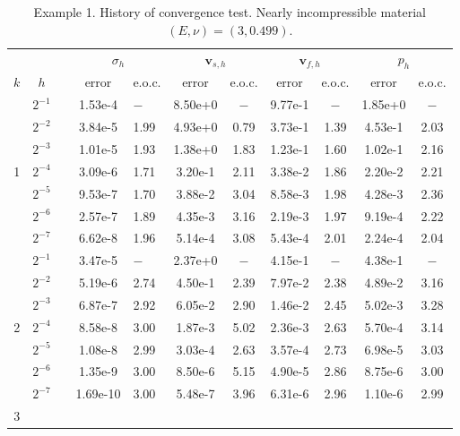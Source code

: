 \documentclass[10pt,letterpaper]{amsart}
\theoremstyle{plain} %
\theoremstyle{remark} %
\newcommand{\vect}[1]{\mathbf{#1}}
\begin{document}
\begin{table}[htbp!]
\small
\centering
\caption{Example 1. History of convergence test. Nearly incompressible material $(E,\nu) = (3,0.499)$.}
\begin{tabular}{@{\hskip .1in}ccl@{\hskip .1in}cl@{\hskip .1in}cc@{\hskip .1in}cc@{\hskip .1in}cc} \toprule
& & &\multicolumn{2}{c}{$\sigma_{h}$}&\multicolumn{2}{c}{$\vect{v}_{s,h}$}&\multicolumn{2}{c}{$\vect{v}_{f,h}$}&\multicolumn{2}{c}{$p_{h}$}\\ 
\cmidrule(lr){4-5} \cmidrule(lr){6-7} \cmidrule(lr){8-9} \cmidrule(lr){10-11}%
$k$ & $h$ & & error & e.o.c. & error & e.o.c. & error & e.o.c.& error & e.o.c.\\ \midrule
\multirow{7}{*}{1} 
 & $2^{-1}$    & & 1.53e-4 & $-$  & 8.50e+0 & $-$  & 9.77e-1 & $-$  & 1.85e+0 & $-$  \\
 & $2^{-2}$    & & 3.84e-5 & 1.99 & 4.93e+0 & 0.79 & 3.73e-1 & 1.39 & 4.53e-1 & 2.03 \\
 & $2^{-3}$    & & 1.01e-5 & 1.93 & 1.38e+0 & 1.83 & 1.23e-1 & 1.60 & 1.02e-1 & 2.16 \\
 & $2^{-4}$    & & 3.09e-6 & 1.71 & 3.20e-1 & 2.11 & 3.38e-2 & 1.86 & 2.20e-2 & 2.21 \\
 & $2^{-5}$    & & 9.53e-7 & 1.70 & 3.88e-2 & 3.04 & 8.58e-3 & 1.98 & 4.28e-3 & 2.36 \\
 & $2^{-6}$    & & 2.57e-7 & 1.89 & 4.35e-3 & 3.16 & 2.19e-3 & 1.97 & 9.19e-4 & 2.22 \\
 & $2^{-7}$    & & 6.62e-8 & 1.96 & 5.14e-4 & 3.08 & 5.43e-4 & 2.01 & 2.24e-4 & 2.04 \\
\midrule
\multirow{7}{*}{2} 
 & $2^{-1}$   & & 3.47e-5 & $-$  & 2.37e+0 & $-$  & 4.15e-1 & $-$  & 4.38e-1 & $-$  \\
 & $2^{-2}$   & & 5.19e-6 & 2.74 & 4.50e-1 & 2.39 & 7.97e-2 & 2.38 & 4.89e-2 & 3.16 \\
 & $2^{-3}$   & & 6.87e-7 & 2.92 & 6.05e-2 & 2.90 & 1.46e-2 & 2.45 & 5.02e-3 & 3.28 \\
 & $2^{-4}$   & & 8.58e-8 & 3.00 & 1.87e-3 & 5.02 & 2.36e-3 & 2.63 & 5.70e-4 & 3.14 \\
 & $2^{-5}$   & & 1.08e-8 & 2.99 & 3.03e-4 & 2.63 & 3.57e-4 & 2.73 & 6.98e-5 & 3.03 \\
 & $2^{-6}$   & & 1.35e-9 & 3.00 & 8.50e-6 & 5.15 & 4.90e-5 & 2.86 & 8.75e-6 & 3.00 \\
 & $2^{-7}$   & & 1.69e-10 & 3.00 & 5.48e-7 & 3.96 & 6.31e-6 & 2.96 & 1.10e-6 & 2.99 \\
\midrule
\multirow{5}{*}{3} 

\end{tabular}
\end{table}
\end{document}
